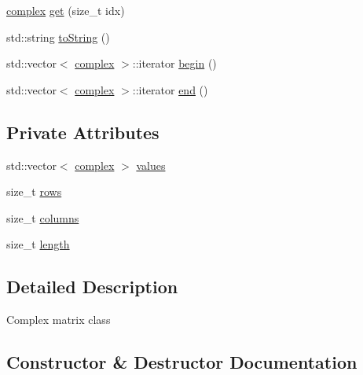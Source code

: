 \begin{DoxyCompactItemize}
\item 
\hyperlink{classqlib_1_1math_1_1complex}{complex} \hyperlink{classqlib_1_1math_1_1matrix_a17dce2bfd8addcb026f6d9159134f1c7}{get} (size\+\_\+t idx)
\item 
std\+::string \hyperlink{classqlib_1_1math_1_1matrix_a06ec639a654b5319f4eb1bff591d6e7b}{to\+String} ()
\item 
std\+::vector$<$ \hyperlink{classqlib_1_1math_1_1complex}{complex} $>$\+::iterator \hyperlink{classqlib_1_1math_1_1matrix_a1cbe9185c4f147d821eeb0b36ed9cc86}{begin} ()
\item 
std\+::vector$<$ \hyperlink{classqlib_1_1math_1_1complex}{complex} $>$\+::iterator \hyperlink{classqlib_1_1math_1_1matrix_ae250bb5455fe71b836a5252335575545}{end} ()
\end{DoxyCompactItemize}
\subsection*{Private Attributes}
\begin{DoxyCompactItemize}
\item 
std\+::vector$<$ \hyperlink{classqlib_1_1math_1_1complex}{complex} $>$ \hyperlink{classqlib_1_1math_1_1matrix_ad764d65375ba1e50381f640bdc181c0b}{values}
\item 
size\+\_\+t \hyperlink{classqlib_1_1math_1_1matrix_af29b6ea4316eb972bbdc55da6e54dbb3}{rows}
\item 
size\+\_\+t \hyperlink{classqlib_1_1math_1_1matrix_ad3c2dd80c600d7bf37ae5bbdf5f056b8}{columns}
\item 
size\+\_\+t \hyperlink{classqlib_1_1math_1_1matrix_aef00292f85054708922acef6b7744a40}{length}
\end{DoxyCompactItemize}


\subsection{Detailed Description}
Complex matrix class 

\subsection{Constructor \& Destructor Documentation}

